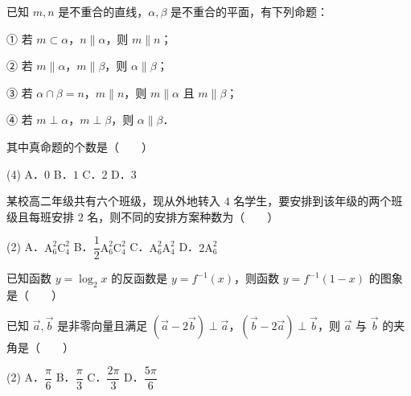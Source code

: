 \begin{question}
已知 $m, n$ 是不重合的直线，$\alpha, \beta$ 是不重合的平面，有下列命题：

① 若 $m \subset \alpha$，$n \parallel \alpha$，则 $m \parallel n$；

② 若 $m \parallel \alpha$，$m \parallel \beta$，则 $\alpha \parallel \beta$；

③ 若 $\alpha \cap \beta = n$，$m \parallel n$，则 $m \parallel \alpha$ 且 $m \parallel \beta$；

④ 若 $m \perp \alpha$，$m \perp \beta$，则 $\alpha \parallel \beta$．

其中真命题的个数是\mbox{（　　）}

\begin{gkopts}(4)
\task A．$0$
\task B．$1$
\task C．$2$
\task D．$3$
\end{gkopts}

\end{question}
\begin{question}
某校高二年级共有六个班级，现从外地转入 $4$ 名学生，要安排到该年级的两个班级且每班安排 $2$ 名，则不同的安排方案种数为\mbox{（　　）}

\begin{gkopts}(2)
\task A．$\mathrm{A}_6^2 \mathrm{C}_4^2$
\task B．$\dfrac{1}{2}\mathrm{A}_6^2 \mathrm{C}_4^2$
\task C．$\mathrm{A}_6^2 \mathrm{A}_4^2$
\task D．$2\mathrm{A}_6^2$
\end{gkopts}

\Needspace{0.4\textheight}
\end{question}
\begin{question}
已知函数 $y = \log_2 x$ 的反函数是 $y = f^{-1}(x)$，则函数 $y = f^{-1}(1 - x)$ 的图象是\mbox{（　　）}
\nopagebreak[4]
\begin{center}\end{center}
\nopagebreak[4]
\end{question}
\begin{question}
已知 $\vec{a}, \vec{b}$ 是非零向量且满足 $(\vec{a} - 2\vec{b}) \perp \vec{a}$，$(\vec{b} - 2\vec{a}) \perp \vec{b}$，则 $\vec{a}$ 与 $\vec{b}$ 的夹角是\mbox{（　　）}

\begin{gkopts}(2)
\task A．$\dfrac{\pi}{6}$
\task B．$\dfrac{\pi}{3}$
\task C．$\dfrac{2\pi}{3}$
\task D．$\dfrac{5\pi}{6}$
\end{gkopts}

\end{question}
